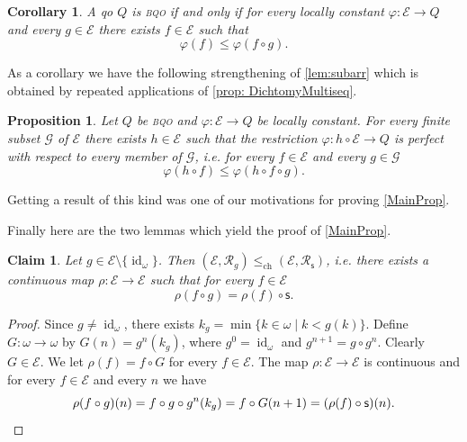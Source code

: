 \documentclass{article}%
\theoremstyle{plain}
\newtheorem{proposition}[theorem]{Proposition}
\newtheorem{corollary}[theorem]{Corollary}
\newtheorem{lemma}[theorem]{Properties}
\newtheorem{lemma}[theorem]{Lemma}
\newtheorem{lemma}[theorem]{Fact}
\newtheorem{lemma}[theorem]{Facts}
\newtheorem{lemma}{Claim}
\theoremstyle{definition}
\theoremstyle{remark}
\newcommand{\bqo}{\textsc{bqo}}
\newcommand{\contMor}{\leq_{\text{ch}}}
\DeclareMathOperator{\id}{\mathrm{id}} %
\newcommand{\Su}{\mathsf{s}}
\newcommand{\IIf}{\mathcal{E}}
\newcommand{\rtrans}[1]{\mathcal{R}_{#1}}
\begin{document}
\begin{corollary}
A qo $Q$ is \bqo{} if and only if for every locally constant $\varphi:\IIf\to Q$ and every $g\in \IIf$ there exists $f\in \IIf$ such that
\[
\varphi(f)\leq \varphi(f\circ g).
\]
\end{corollary}




As a corollary we have the following strengthening of \cref{lem:subarr} which is obtained by repeated applications of \cref{prop: DichtomyMultiseq}.

\begin{proposition}\label{prop GenPerfect}
Let $Q$ be \bqo{} and $\varphi:\IIf\to Q$ be locally constant. For every finite subset $\mathcal{G}$ of $\IIf$ there exists $h\in \IIf$ such that the restriction $\varphi:h\circ \IIf \to Q$ is perfect with respect to every member of $\mathcal{G}$, i.e. for every $f\in \IIf$ and every $g\in \mathcal{G}$
\[
\varphi(h\circ f)\leq \varphi(h\circ f\circ g).
\]
\end{proposition}

Getting a result of this kind was one of our motivations for proving \cref{MainProp}. 

Finally here are the two lemmas which yield the proof of \cref{MainProp}.



\begin{lemma}\label{RmapLemma}
Let $g\in\IIf\setminus\{ \id_{\omega}\}$. Then $(\IIf,\rtrans{g})\contMor (\IIf,\rtrans{\Su})$, i.e. there exists a continuous map $\rho:\IIf \to \IIf$ such that for every $f\in \IIf$
\[
\rho(f\circ g)=\rho(f)\circ \Su.
\]
\end{lemma}

\begin{proof}
Since $g\neq \id_{\omega}$, there exists $k_{g}=\min\{k\in\omega\mid k<g(k)\}$. 
Define $G:\omega\to \omega$ by $G(n)=g^{n}(k_{g})$, where $g^{0}=\id_{\omega}$ and $g^{n+1}=g\circ g^{n}$. Clearly $G\in \IIf$. We let $\rho(f)=f\circ G$ for every $f\in \IIf$. The map $\rho:\IIf\to \IIf$ is continuous and for every $f\in \IIf$ and every $n$ we have \[
\rho(f\circ g)(n)=f\circ g\circ g^{n}(k_{g})=f\circ G(n+1)=(\rho(f)\circ \Su)(n).\qedhere
\] 
\end{proof}
\end{document}
